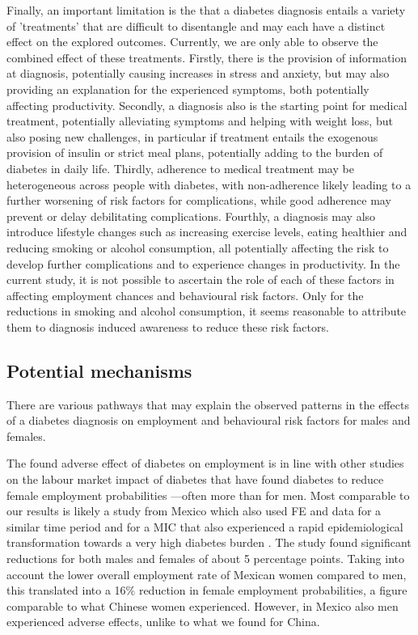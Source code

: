Finally, an important limitation is the that a diabetes diagnosis entails a variety of 'treatments' that are difficult to disentangle and may each have a distinct effect on the explored outcomes. Currently, we are only able to observe the combined effect of these treatments. Firstly, there is the provision of information at diagnosis, potentially causing increases in stress and anxiety, but may also providing an explanation for the experienced symptoms, both potentially affecting productivity. Secondly, a diagnosis also is the starting point for medical treatment, potentially alleviating symptoms and helping with weight loss, but also posing new challenges, in particular if treatment entails the exogenous provision of insulin or strict meal plans, potentially adding to the burden of diabetes in daily life. Thirdly, adherence to medical treatment may be heterogeneous across people with diabetes, with non-adherence likely leading to a further worsening of risk factors for complications, while good adherence may prevent or delay debilitating complications. Fourthly, a diagnosis may also introduce lifestyle changes such as increasing exercise levels, eating healthier and reducing smoking or alcohol consumption, all potentially affecting the risk to develop further complications and to experience changes in productivity. In the current study, it is not possible to ascertain the role of each of these factors in affecting employment chances and behavioural risk factors. Only for the reductions in smoking and alcohol consumption, it seems reasonable to attribute them to diagnosis induced awareness to reduce these risk factors.


\subsection{Potential mechanisms}

There are various pathways that may explain the observed patterns in the effects of a diabetes diagnosis on employment and behavioural risk factors for males and females. 

The found adverse effect of diabetes on employment is in line with other studies on the labour market impact of diabetes that have found diabetes to reduce female employment probabilities \parencite{Minor2010,Latif2009,Harris2009,Seuring2016}---often more than for men. Most comparable to our results is likely a study from Mexico which also used \ac{FE} and data for a similar time period and for a \ac{MIC} that also experienced a rapid epidemiological transformation towards a very high diabetes burden  \parencite{Seuring2016}. The study found significant reductions for both males and females of about 5 percentage points. Taking into account the lower overall employment rate of Mexican women compared to men, this translated into a 16\% reduction in female employment probabilities, a figure comparable to what Chinese women experienced. However, in Mexico also men experienced adverse effects, unlike to what we found for China.

